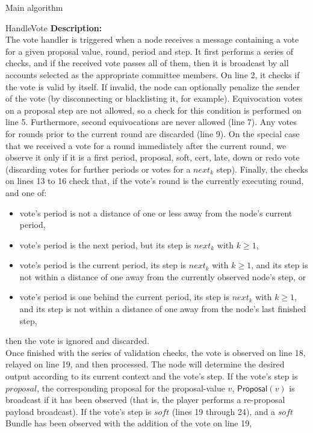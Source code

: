 \documentclass[10pt,a4paper]{article}
\begin{document}
\begin{section}{Main algorithm}
\begin{subsection}{HandleVote}
\noindent \textbf{Description:}\\
The vote handler is triggered when a node receives a message containing a vote for a given proposal value, round, period and step.
It first performs a series of checks, and if the received vote passes all of them, then it is broadcast by all accounts selected
as the appropriate committee members.
On line 2, it checks if the vote is valid by itself. If invalid, the node can optionally penalize the sender of the vote
(by disconnecting or blacklisting it, for example).
Equivocation votes on a proposal step are not allowed, so a check for this condition is performed on line 5.
Furthermore, second equivocations are never allowed (line 7).
Any votes for rounds prior to the current round are discarded (line 9).
On the special case that we received a vote for a round immediately after the current round, we observe it only if it is a first period,
proposal, soft, cert, late, down or redo vote (discarding votes for further periods or votes for a $next_k$ step).
Finally, the checks on lines 13 to 16 check that, if the vote's round is the currently executing round, and one of:
\begin{itemize}
    \item vote's period is not a distance of one or less away from the node's current period,
    \item vote's period is the next period, but its step is $next_{k}$ with $k \geq 1$,
    \item vote's period is the current period, its step is $next_{k}$ with $k \geq 1$, 
and its step is not within a distance of one away from the currently observed node's step, or
    \item vote's period is one behind the current period, its step is $next_{k}$ with $k \geq 1$, and
its step is not within a distance of one away from the node's last finished step,
\end{itemize}
then the vote is ignored and discarded. \\
Once finished with the series of validation checks, the vote is observed on line 18, relayed on line 19, and then processed.
The node will determine the desired output according to its current context and the vote's step.
If the vote's step is $proposal$, the corresponding proposal for the proposal-value $v$, $\mathsf{Proposal}(v)$ is broadcast if it has been observed 
(that is, the player performs a re-proposal payload broadcast).
If the vote's step is $soft$ (lines 19 through 24), and a $soft$ Bundle has been observed with the addition of the vote on line 19,

\end{subsection}
\end{section}
\end{document}
